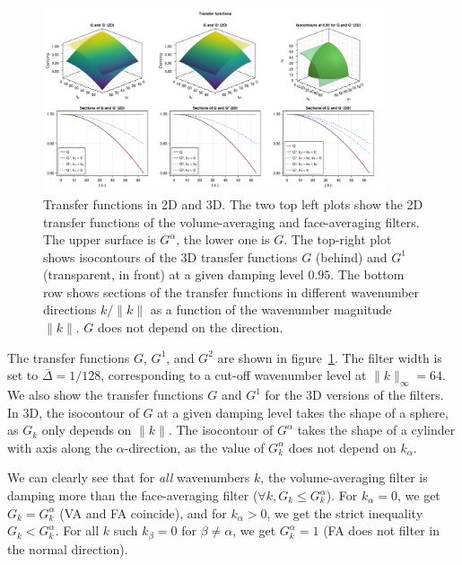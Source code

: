 \documentclass[preprint]{elsarticle}
\newcommand{\revtwo}[1]{#1}
\begin{document}
\begin{figure}
    \centering
    \includegraphics[width=0.9\textwidth]{figures_transferfunctions.png} 
    \caption{\revtwo{
        Transfer functions in 2D and 3D. The two top left plots show the 2D
        transfer functions of the volume-averaging and face-averaging filters.
        The upper surface is $G^\alpha$, the lower one is $G$.
        The top-right plot shows isocontours of the 3D transfer functions $G$
        (behind) and $G^1$ (transparent, in front) at a given damping level
        $0.95$. The bottom row shows sections of the transfer functions in
        different wavenumber directions $k / \| k \|$ as a function of the
        wavenumber magnitude $\| k \|$. $G$ does not depend on the direction.
    }}
    \label{fig:transferfunctions}
\end{figure}

The transfer functions $G$, $G^1$, and $G^2$ are shown in
figure~\ref{fig:transferfunctions}.
The filter width is set to $\bar{\Delta} = 1 / 128$, corresponding to a cut-off
wavenumber level at $\| k \|_\infty = 64$. We also show the transfer
functions $G$ and $G^1$ for the 3D versions of the filters.
In 3D, the isocontour of $G$ at a given damping level takes the shape of a
sphere, as $G_k$ only depends on $\| k \|$. The isocontour of $G^\alpha$ takes
the shape of a cylinder with axis along the $\alpha$-direction, as the value of
$G^\alpha_k$ does not depend on $k_\alpha$.

We can clearly see that for \emph{all} wavenumbers $k$,
the volume-averaging filter is damping more than the face-averaging filter
($\forall k, G_k \leq G^\alpha_k$).
For $k_\alpha = 0$, we get $G_k = G^\alpha_k$ (VA and FA coincide),
and for $k_\alpha > 0$, we get the strict inequality $G_k < G^\alpha_k$.
For all $k$ such $k_\beta = 0$ for $\beta \neq \alpha$, we get
$G^\alpha_k = 1$ (FA does not filter in the normal direction).
\end{document}
